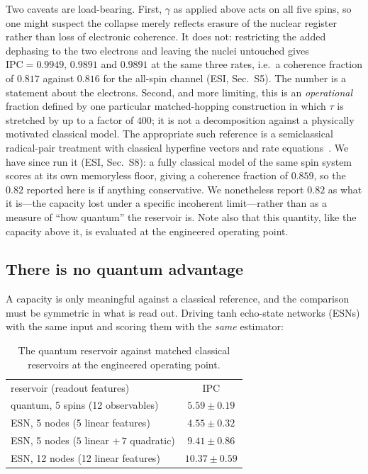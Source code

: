 \documentclass[aps,prx,reprint,superscriptaddress,nofootinbib,floatfix]{revtex4-2}
\begin{document}
Two caveats are load-bearing. First, $\gamma$ as applied above acts on all five
spins, so one might suspect the collapse merely reflects erasure of the nuclear
register rather than loss of electronic coherence. It does not: restricting the
added dephasing to the two electrons and leaving the nuclei untouched gives
$\mathrm{IPC}=0.9949$, $0.9891$ and $0.9891$ at the same three rates, i.e.\ a
coherence fraction of $0.817$ against $0.816$ for the all-spin channel
(ESI, Sec.~S5). The number is a statement about the electrons.
Second, and more limiting, this is an \emph{operational} fraction defined by one
particular matched-hopping construction in which $\tau$ is stretched by up to a
factor of $400$; it is not a decomposition against a physically motivated
classical model. The appropriate such reference is a semiclassical
radical-pair treatment with classical hyperfine vectors and rate
equations~\cite{Timmel1998}. We have since run it (ESI,
Sec.~S8): a fully classical model of the same spin system scores at its own
memoryless floor, giving a coherence fraction of $0.859$, so the $0.82$ reported
here is if anything conservative. We nonetheless report $0.82$ as what it
is---the capacity lost under a specific incoherent limit---rather than as a
measure of ``how quantum'' the reservoir is. Note also that this quantity, like
the capacity above it, is evaluated at the engineered operating point.

\subsection{There is no quantum advantage}

A capacity is only meaningful against a classical reference, and the comparison must
be symmetric in what is read out. Driving tanh echo-state networks (ESNs) with the
same input and scoring them with the \emph{same} estimator:

\begin{table}[htbp]
\caption{\label{tab:esn_eng}The quantum reservoir against matched classical reservoirs at the engineered operating point.}
\begin{ruledtabular}
\begin{tabular}{lc}
reservoir (readout features) & IPC \\
quantum, 5 spins (12 observables) & $5.59\pm0.19$ \\
ESN, 5 nodes (5 linear features)  & $4.55\pm0.32$ \\
ESN, 5 nodes ($5$ linear $+\,7$ quadratic) & $9.41\pm0.86$ \\
ESN, 12 nodes (12 linear features) & $10.37\pm0.59$ \\
\end{tabular}
\end{ruledtabular}
\end{table}
\end{document}
